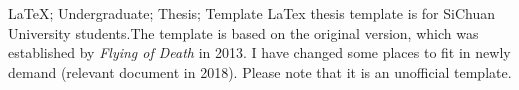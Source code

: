 \makecover

\begin{abstract}{\LaTeX; 本科; 毕业论文; 模板}
本模版是根据overleaf上的 2018 年的 undergraduate thesis template 修改的，同时追本溯源，来源应当是2013年学长的这个\href{https://github.com/dahakawang/scu_thesis_template}{\textcolor{red}{repo}}。

目前模版是按照2025年计算机学院发送的本科生毕业论文设计模版修改的。很可能有不符合《四川大学本科毕业论文（设计）管理办法（修订）-川大教【2022】56号》文件内具体要求的地方. 欢迎大家提PR。
\end{abstract}


\begin{abstractEng}{\LaTeX; Undergraduate; Thesis; Template}
LaTex thesis template is for SiChuan University students.The template is 
based on the original version, which was established by \textit{Flying of Death} in 2013. I have changed some places to fit in newly demand
(relevant document in 2018). Please note that it is an unofficial 
template. 
\end{abstractEng}

\tableofcontents

\clearpage

